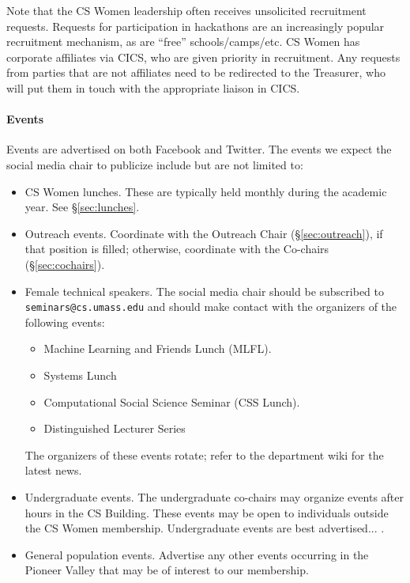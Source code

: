Note that the CS Women leadership often receives unsolicited recruitment requests. Requests for participation in hackathons are an increasingly popular recruitment mechanism, as are ``free'' schools/camps/etc. CS Women has corporate affiliates via CICS, who are given priority in recruitment. Any requests from parties that are not affiliates need to be redirected to the Treasurer, who will put them in touch with the appropriate liaison in CICS.

\label{sec:socialmedia_eligibility}
\paragraph{Events} Events are advertised on both Facebook and Twitter. The events we expect the social media chair to publicize include but are not limited to:
\begin{itemize}
	\item CS Women lunches. These are typically held monthly during the academic year. See \S\ref{sec:lunches}.
	\item Outreach events. Coordinate with the Outreach Chair (\S\ref{sec:outreach}), if that position is filled; otherwise, coordinate with the Co-chairs (\S\ref{sec:cochairs}).
	\item Female technical speakers. The social media chair should be subscribed to \verb|seminars@cs.umass.edu| and should make contact with the organizers of the following events:
		\begin{itemize}
		\item Machine Learning and Friends Lunch (MLFL).
		\item Systems Lunch
		\item Computational Social Science Seminar (CSS Lunch).
		\item Distinguished Lecturer Series
		\end{itemize}
		The organizers of these events rotate; refer to the department wiki for the latest news.
	\item Undergraduate events. The undergraduate co-chairs may organize events after hours in the CS Building. These events may be open to individuals outside the CS Women membership. Undergraduate events are best advertised... .
	\item General population events. Advertise any other events occurring in the Pioneer Valley that may be of interest to our membership.
\end{itemize}

